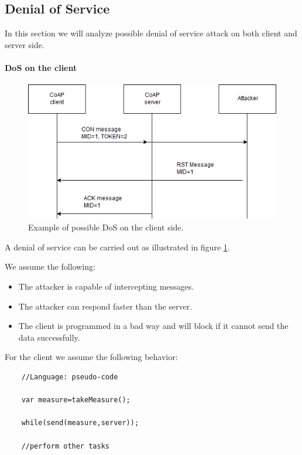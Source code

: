 	\subsection{Denial of Service}
	In this section we will analyze possible denial of service attack on both client and server side.
	
	\paragraph{DoS on the client}
	\begin{figure}
		\includegraphics[width=\linewidth]{coap-vuln-img0.png}
		\caption{Example of possible DoS on the client side.}
		\label{fig:coap-vuln0}
	\end{figure}
	A denial of service can be carried out as illustrated in figure \ref{fig:coap-vuln0}.\newline
	
	We assume the following:
	\begin{itemize}
		\item The attacker is capable of intercepting messages.
		\item The attacker can respond faster than the server.
		\item The client is programmed in a bad way and will block if it cannot send the data successfully.
	\end{itemize}

	For the client we assume the following behavior:
	\begin{lstlisting}
	//Language: pseudo-code
	
	var measure=takeMeasure();
	
	while(send(measure,server));
	
	//perform other tasks
	\end{lstlisting}
	
